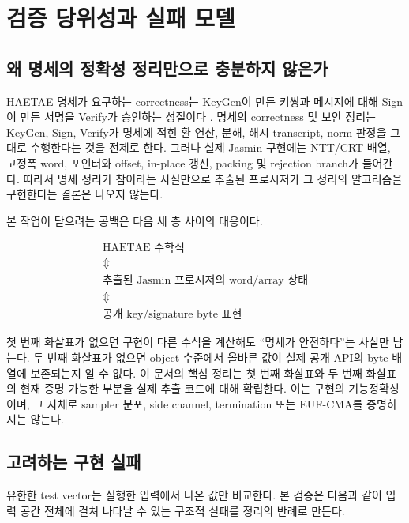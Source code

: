 \section{검증 당위성과 실패 모델}
\label{sec:rationale}

\subsection{왜 명세의 정확성 정리만으로 충분하지 않은가}

HAETAE 명세가 요구하는 correctness는 KeyGen이 만든 키쌍과 메시지에 대해
Sign이 만든 서명을 Verify가 승인하는 성질이다 \cite{haetae-spec}. 명세의
correctness 및 보안 정리는 KeyGen, Sign, Verify가 명세에 적힌 환 연산, 분해,
해시 transcript, norm 판정을 그대로 수행한다는 것을 전제로 한다. 그러나 실제
Jasmin 구현에는 NTT/CRT 배열, 고정폭 word, 포인터와 offset, in-place 갱신,
packing 및 rejection branch가 들어간다. 따라서 명세 정리가 참이라는 사실만으로
추출된 프로시저가 그 정리의 알고리즘을 구현한다는 결론은 나오지 않는다.

본 작업이 닫으려는 공백은 다음 세 층 사이의 대응이다.

\[
\begin{gathered}
  \text{HAETAE 수학식}\\[-0.15em]
  \Updownarrow\\[-0.15em]
  \text{추출된 Jasmin 프로시저의 word/array 상태}\\[-0.15em]
  \Updownarrow\\[-0.15em]
  \text{공개 key/signature byte 표현}
\end{gathered}
\]

첫 번째 화살표가 없으면 구현이 다른 수식을 계산해도 ``명세가 안전하다''는
사실만 남는다. 두 번째 화살표가 없으면 object 수준에서 올바른 값이 실제 공개
API의 byte 배열에 보존되는지 알 수 없다. 이 문서의 핵심 정리는 첫 번째
화살표와 두 번째 화살표의 현재 증명 가능한 부분을 실제 추출 코드에 대해
확립한다. 이는 구현의 기능정확성이며, 그 자체로 sampler 분포, side channel,
termination 또는 EUF-CMA를 증명하지는 않는다.

\subsection{고려하는 구현 실패}

유한한 test vector는 실행한 입력에서 나온 값만 비교한다. 본 검증은 다음과 같이
입력 공간 전체에 걸쳐 나타날 수 있는 구조적 실패를 정리의 반례로 만든다.

